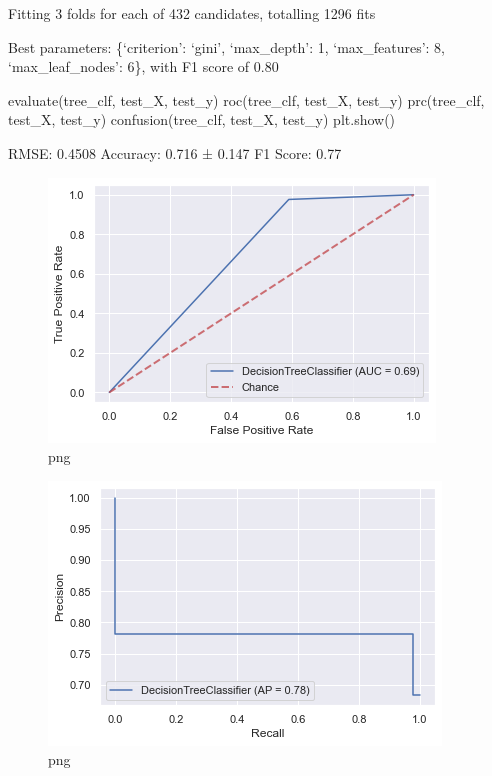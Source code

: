 \documentclass[]{article}
\newenvironment{Shaded}{}{}
\newcommand{\NormalTok}[1]{#1}
\begin{document}
Fitting 3 folds for each of 432 candidates, totalling 1296 fits

Best parameters: \{`criterion': `gini', `max\_depth': 1,
`max\_features': 8, `max\_leaf\_nodes': 6\}, with F1 score of 0.80

\begin{Shaded}
\begin{Highlighting}[]
\NormalTok{evaluate(tree_clf, test_X, test_y)}
\NormalTok{roc(tree_clf, test_X, test_y)}
\NormalTok{prc(tree_clf, test_X, test_y)}
\NormalTok{confusion(tree_clf, test_X, test_y)}
\NormalTok{plt.show()}
\end{Highlighting}
\end{Shaded}

RMSE: 0.4508 Accuracy: 0.716 ± 0.147 F1 Score: 0.77

\begin{figure}
\centering
\includegraphics{notebook_files/notebook_44_1.png}
\caption{png}
\end{figure}

\begin{figure}
\centering
\includegraphics{notebook_files/notebook_44_2.png}
\caption{png}
\end{figure}
\end{document}
